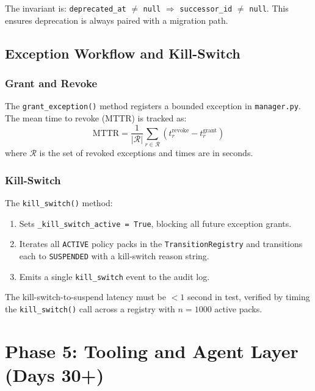 \documentclass[12pt,letterpaper]{article}
\theoremstyle{definition}
\theoremstyle{remark}
\begin{document}
The invariant is: \texttt{deprecated\_at} $\neq$ \texttt{null} $\Rightarrow$
\texttt{successor\_id} $\neq$ \texttt{null}. This ensures deprecation is always
paired with a migration path.

\subsection{Exception Workflow and Kill-Switch}

\subsubsection{Grant and Revoke}

The \texttt{grant\_exception()} method registers a bounded exception in
\texttt{manager.py}. The mean time to revoke (MTTR) is tracked as:
\[
  \text{MTTR} = \frac{1}{|\mathcal{R}|} \sum_{r \in \mathcal{R}} (t_r^{\text{revoke}} - t_r^{\text{grant}}) \tag{20}
\]
where \(\mathcal{R}\) is the set of revoked exceptions and times are in seconds.

\subsubsection{Kill-Switch}

The \texttt{kill\_switch()} method:
\begin{enumerate}
  \item Sets \texttt{\_kill\_switch\_active = True}, blocking all future exception grants.
  \item Iterates all \texttt{ACTIVE} policy packs in the \texttt{TransitionRegistry} and
        transitions each to \texttt{SUSPENDED} with a kill-switch reason string.
  \item Emits a single \texttt{kill\_switch} event to the audit log.
\end{enumerate}

The kill-switch-to-suspend latency must be \(< 1\) second in test, verified by
timing the \texttt{kill\_switch()} call across a registry with \(n = 1000\) active
packs.

\newpage

\section{Phase 5: Tooling and Agent Layer (Days 30+)}
\end{document}

